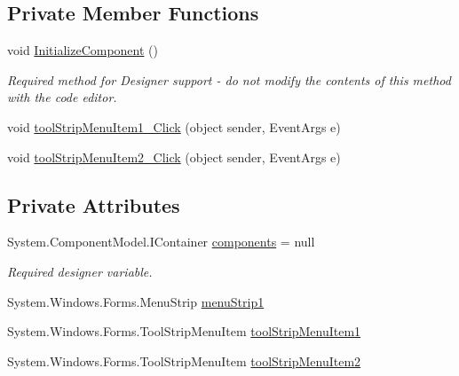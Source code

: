 \subsection*{Private Member Functions}
\begin{DoxyCompactItemize}
\item 
void \hyperlink{class__7___doroshenko__forms2__is52_1_1_individual_aa5f3989e9a76bfe28e9848301f701e6a}{Initialize\+Component} ()
\begin{DoxyCompactList}\small\item\em Required method for Designer support -\/ do not modify the contents of this method with the code editor. \end{DoxyCompactList}\item 
void \hyperlink{class__7___doroshenko__forms2__is52_1_1_individual_a1457fce6b1dde96e8f73fb4b60f50793}{tool\+Strip\+Menu\+Item1\+\_\+\+Click} (object sender, Event\+Args e)
\item 
void \hyperlink{class__7___doroshenko__forms2__is52_1_1_individual_ac870b8e07b603d4fe209908fe7e4edcf}{tool\+Strip\+Menu\+Item2\+\_\+\+Click} (object sender, Event\+Args e)
\end{DoxyCompactItemize}
\subsection*{Private Attributes}
\begin{DoxyCompactItemize}
\item 
System.\+Component\+Model.\+I\+Container \hyperlink{class__7___doroshenko__forms2__is52_1_1_individual_ae134670f004ef6edbdbbe74e32943c15}{components} = null
\begin{DoxyCompactList}\small\item\em Required designer variable. \end{DoxyCompactList}\item 
System.\+Windows.\+Forms.\+Menu\+Strip \hyperlink{class__7___doroshenko__forms2__is52_1_1_individual_a692f635421c7867ef8dc488571d7fb8a}{menu\+Strip1}
\item 
System.\+Windows.\+Forms.\+Tool\+Strip\+Menu\+Item \hyperlink{class__7___doroshenko__forms2__is52_1_1_individual_a40ad515f8daeec5070f91b875c7c0a7a}{tool\+Strip\+Menu\+Item1}
\item 
System.\+Windows.\+Forms.\+Tool\+Strip\+Menu\+Item \hyperlink{class__7___doroshenko__forms2__is52_1_1_individual_aac6217256c1c0ec2ec08bb8452b985fc}{tool\+Strip\+Menu\+Item2}
\end{DoxyCompactItemize}



